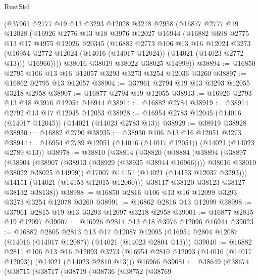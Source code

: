 \begin{lexlean}{RustStd}
\begin{coremodule}
      (@37961
        @2777
        @19
        @13
        @3293
        @12028
        @3218
        @2958
        (@16877
          @2777
          @19
          @12028
          (@16926
            @2776
            @13
            @18
            @3976
            @12027
            @16944
            (@16882
              @698
              @2775
              @13
              @17
              @4975
              @12026
              @20345
              (@16882
                @2773
                @106
                @13
                @16
                @12024
                @3273
                (@16954 @2772 @12024 (@14016 (@14017 @12024)) (@14021 (@14023 @2772 @13)))
                @16966))))
        @38016
        @38019
        @38022
        @38025
        @14999))
@38894 := @16850 @2795 @106 @13 @16 @12057 @3293 @3273 @3254 @12036 @3260
@38897 := @16862 @2795 @13 @12057
@38904 := @37961 @2794 @19 @13 @3293 @12055 @3218 @2958
@38907 := @16877 @2794 @19 @12055
@38913 := @16926 @2793 @13 @18 @3976 @12054 @16944
@38914 := @16882 @2784
@38919 := @38914 @2792 @13 @17 @12045 @12053
@38928 := @16954 @2783 @12045 (@14016 (@14017 @12045)) (@14021 (@14023 @2783 @13))
@38929 := @38919 @38928
@38930 := @16882 @2790
@38935 := @38930 @106 @13 @16 @12051 @3273
@38944 := @16954 @2789 @12051 (@14016 (@14017 @12051)) (@14021 (@14023 @2789 @13))
@38978 := @38810
    (@38814
      (@38820
        (@38884
          (@38894
            (@38897
              (@38904
                (@38907 (@38913 (@38929 (@38935 @38944 @16966))))
                @38016
                @38019
                @38022
                @38025
                @14999))
            @17007
            @14151
            (@14021 (@14153 @12037 @3293)))
          @14151
          (@14021 (@14153 @12015 @12060)))
        @38117
        @38120
        @38123
        @38127
        @38132
        @38138))
@38988 := @16850 @2816 @106 @13 @16 @12099 @3293 @3273 @3254 @12078 @3260
@38991 := @16862 @2816 @13 @12099
@38998 := @37961 @2815 @19 @13 @3293 @12097 @3218 @2958
@39001 := @16877 @2815 @19 @12097
@39007 := @16926 @2814 @13 @18 @3976 @12096 @16944
@39023 := @16882
    @2805
    @2813
    @13
    @17
    @12087
    @12095
    (@16954 @2804 @12087 (@14016 (@14017 @12087)) (@14021 (@14023 @2804 @13)))
@39040 := @16882
    @2811
    @106
    @13
    @16
    @12093
    @3273
    (@16954 @2810 @12093 (@14016 (@14017 @12093)) (@14021 (@14023 @2810 @13)))
    @16966
@39081 := @38649
    (@38674
      (@38715
        (@38717
          (@38719
            (@38736
              (@38752
                (@38769

\end{coremodule}
\end{lexlean}
